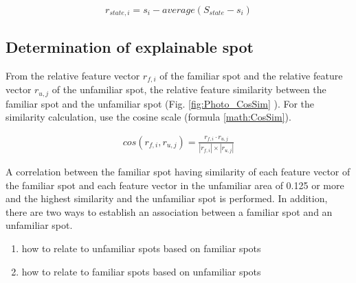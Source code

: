 \documentclass[journal]{IAENGtran}
\begin{document}
\begin{equation}
  r_{state,i}=s_i-average(S_{state}-s_i)
  \label{math:Vector difference}
\end{equation}


\subsection{Determination of explainable spot}
\label{subsec:Determination of explainable spot}

From the relative feature vector $r_{f,i}$ of the familiar spot and the relative feature vector $r_{u,j}$ of the unfamiliar spot, the relative feature similarity between the familiar spot and the unfamiliar spot (Fig. \ref{fig:Photo_CosSim} ).
For the similarity calculation, use the cosine scale (formula \ref{math:CosSim}).

\begin{eqnarray}
  cos(r_{f,i},r_{u,j})=\frac{r_{f,i} \cdot r_{u,j}}{|r_{f,i}| \times |r_{u,j}|}
  \label{math:CosSim}
\end{eqnarray}

A correlation between the familiar spot having similarity of each feature vector of the familiar spot and each feature vector in the unfamiliar area of 0.125 or more and the highest similarity and the unfamiliar spot is performed.
In addition, there are two ways to establish an association between a familiar spot and an unfamiliar spot.

\begin{enumerate}
  \item how to relate to unfamiliar spots based on familiar spots
  \item how to relate to familiar spots based on unfamiliar spots
\end{enumerate}
\end{document}

